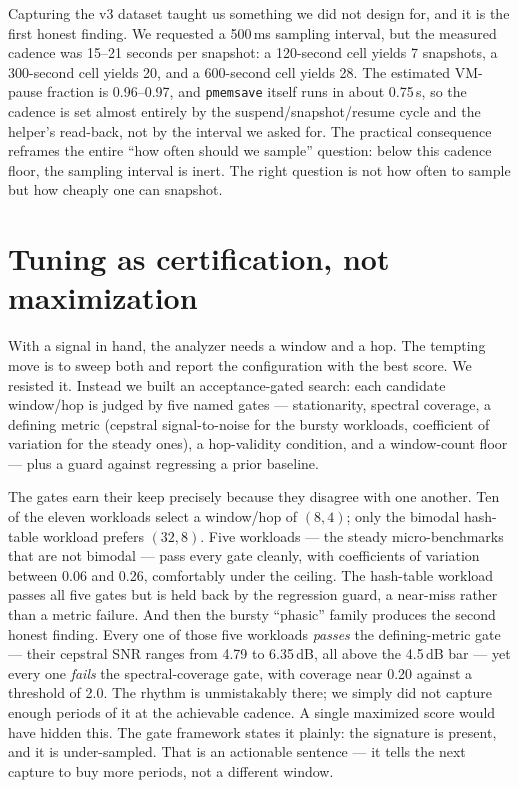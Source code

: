 \documentclass[11pt]{article}
\begin{document}
Capturing the v3 dataset taught us something we did not design for, and it is the
first honest finding. We requested a 500\,ms sampling interval, but the measured
cadence was 15--21 seconds per snapshot: a 120-second cell yields 7 snapshots, a
300-second cell yields 20, and a 600-second cell yields 28. The estimated
VM-pause fraction is 0.96--0.97, and \texttt{pmemsave} itself runs in about
0.75\,s, so the cadence is set almost entirely by the suspend/snapshot/resume
cycle and the helper's read-back, not by the interval we asked for. The practical
consequence reframes the entire ``how often should we sample'' question: below
this cadence floor, the sampling interval is inert. The right question is not
how often to sample but how cheaply one can snapshot.

\section{Tuning as certification, not maximization}

With a signal in hand, the analyzer needs a window and a hop. The tempting move
is to sweep both and report the configuration with the best score. We resisted
it. Instead we built an acceptance-gated search: each candidate window/hop is
judged by five named gates --- stationarity, spectral coverage, a defining
metric (cepstral signal-to-noise for the bursty workloads, coefficient of
variation for the steady ones), a hop-validity condition, and a window-count
floor --- plus a guard against regressing a prior baseline.

The gates earn their keep precisely because they disagree with one another. Ten
of the eleven workloads select a window/hop of $(8,4)$; only the bimodal
hash-table workload prefers $(32,8)$. Five workloads --- the steady
micro-benchmarks that are not bimodal --- pass every gate cleanly, with
coefficients of variation between 0.06 and 0.26, comfortably under the ceiling.
The hash-table workload passes all five gates but is held back by the regression
guard, a near-miss rather than a metric failure. And then the bursty
``phasic'' family produces the second honest finding. Every one of those five
workloads \emph{passes} the defining-metric gate --- their cepstral SNR ranges
from 4.79 to 6.35\,dB, all above the 4.5\,dB bar --- yet every one \emph{fails}
the spectral-coverage gate, with coverage near 0.20 against a threshold of 2.0.
The rhythm is unmistakably there; we simply did not capture enough periods of it
at the achievable cadence. A single maximized score would have hidden this. The
gate framework states it plainly: the signature is present, and it is
under-sampled. That is an actionable sentence --- it tells the next capture to
buy more periods, not a different window.
\end{document}
